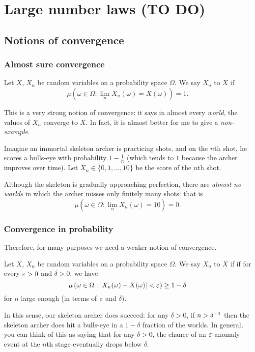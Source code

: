 \chapter{Large number laws (TO DO)}
\label{ch:large_number_laws}
\section{Notions of convergence}
\subsection{Almost sure convergence}
\begin{definition}
	Let $X$, $X_n$ be random variables on a probability space $\Omega$.
	We say $X_n$  to $X$ if
	\[ \mu \left( \omega \in \Omega :
		\lim_n X_n(\omega) = X(\omega) \right) = 1. \]
\end{definition}
This is a very strong notion of convergence:
it says in almost every \emph{world},
the values of $X_n$ converge to $X$.
In fact, it is almost better for me to give a \emph{non-example}.
\begin{example}
	Imagine an immortal skeleton archer is practicing shots,
	and on the $n$th shot, he scores a bulls-eye with probability
	$1 - \frac 1n$
	(which tends to $1$ because the archer improves over time).
	Let $X_n \in \{0, 1, \dots, 10\}$ be the score of the $n$th shot.

	Although the skeleton is gradually approaching perfection,
	there are \emph{almost no worlds} in which the archer
	misses only finitely many shots: that is
	\[ \mu \left( \omega \in \Omega :
		\lim_n X_n(\omega) = 10 \right) = 0. \]
\end{example}

\subsection{Convergence in probability}
Therefore, for many purposes we need a weaker notion of convergence.
\begin{definition}
	Let $X$, $X_n$ be random variables on a probability space $\Omega$.
	We say $X_n$  to $X$ if
	if for every $\varepsilon > 0$ and $\delta > 0$, we have
	\[ \mu \left( \omega \in \Omega :
			\left\lvert X_n(\omega) - X(\omega) \right\rvert < \varepsilon
		\right) \ge 1 - \delta  \]
	for $n$ large enough (in terms of $\varepsilon$ and $\delta$).
\end{definition}
In this sense, our skeleton archer does succeed:
for any $\delta > 0$, if $n > \delta^{-1}$
then the skeleton archer does hit a bulls-eye
in a $1-\delta$ fraction of the worlds.
In general, you can think of this as saying that for any $\delta > 0$,
the chance of an $\varepsilon$-anomaly event at the $n$th stage
eventually drops below $\delta$.

